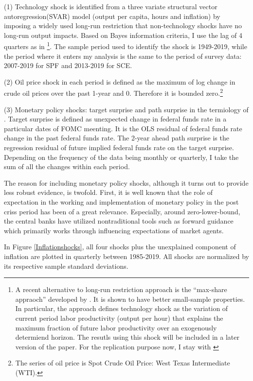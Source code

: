 \documentclass[]{article}
\begin{document}
(1) Technology shock is identified from a three variate structural vector autoregression(SVAR) model  (output per capita, hours and inflation) by imposing a widely used long-run restriction that non-technology shocks have no long-run output impacts. Based on Bayes information criteria, I use the lag of 4 quarters as in \citet{coibion2012can} \footnote{A recent alternative to long-run restriction approach is the ``max-share appraoch'' developed by \citet{francis2014flexible}. It is shown to have better small-sample properties. In particular,  the approach defines technology shock as the variation of current period labor productivity (output per hour) that explains the maximum fraction of future labor productivity over an exogenously determiend horizon. The resutls using this shock will be included in a later version of the paper. For the replication purpose now, I stay with \citet{gali1999technology}}. The sample period used to identify the shock is 1949-2019, while the period where it enters my analysis is the same to the period of survey data: 2007-2019 for SPF and 2013-2019 for SCE. 

(2) Oil price shock in each period is defined as the maximum of log change in crude oil prices over the past 1-year and 0. Therefore it is bounded zero.\footnote{The series of oil price is Spot Crude Oil Price: West Texas Intermediate (WTI).}

(3) Monetary policy shocks: target surprise and path surprise in the termiology of \citet{laseen2011anticipated}. Target surprise is defined as unexpected change in federal funds rate in a particular dates of FOMC meenting. It is the OLS residual of federal funds rate change in the past federal funds rate. The 2-year ahead path surprise is the regression residual of future implied federal funds rate on the target surprise. Depending on the frequency of the data being monthly or quarterly, I take the sum of all the changes within each period.   

The reason for including monetary policy shocks, although it turns out to provide less robust evidence, is twofold. First, it is well known that the role of expectation in the working and implementation of monetary policy in the post criss period has been of a great relevance. Especially, around zero-lower-bound, the central banks have utilized nontraditional tools such as forward guidance which primarily works through influencing expectations of market agents. 

In Figure \ref{Inflationshocks}, all four shocks plus the unexplained component of inflation are plotted in quarterly between 1985-2019. All shocks are normalized by its respective sample standard deviations. 
\end{document}
